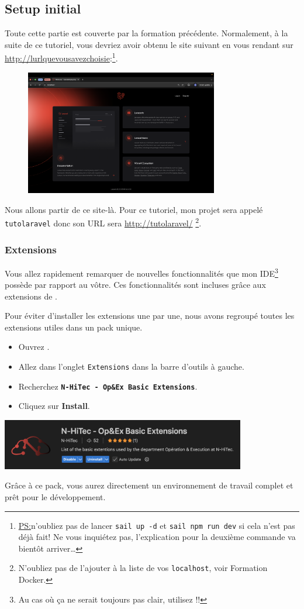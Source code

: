 \subsection{Setup initial}

Toute cette partie est couverte par la formation précédente. Normalement, à la suite de ce tutoriel, vous devriez avoir obtenu le site suivant en vous rendant sur \url{http://lurlquevousavezchoisie}:\footnote{\underline{PS:}n'oubliez pas de lancer \verb|sail up -d| et \verb|sail npm run dev| si cela n'est pas déjà fait! Ne vous inquiétez pas, l'explication pour la deuxième commande va bientôt arriver\ldots}.

\begin{figure}[!h]
    \centering
    \includegraphics[width=0.75\textwidth]{figures-C1/laravel_default_website.png}
\end{figure}

Nous allons partir de ce site-là. Pour ce tutoriel, mon projet sera appelé \texttt{tutolaravel} donc son URL sera \url{http://tutolaravel/} \footnote{N'oubliez pas de l'ajouter à la liste de vos \texttt{localhost}, voir Formation Docker.}.

\newpage
\subsubsection[Extensions]{Extensions}

Vous allez rapidement remarquer de nouvelles fonctionnalités que mon IDE\footnote{Au cas où ça ne serait toujours pas clair, utilisez \vscode{} !!} possède par rapport au vôtre. Ces fonctionnalités sont incluses grâce aux extensions de \vscode{}. 

Pour éviter d’installer les extensions une par une, nous avons regroupé toutes les extensions utiles dans un pack unique.  

\begin{itemize}
    \item Ouvrez \vscode{}.
    \item Allez dans l’onglet \verb|Extensions| dans la barre d’outils à gauche.
    \item Recherchez \textbf{\texttt{N-HiTec - Op\&Ex Basic Extensions}}.
    \item Cliquez sur \textbf{Install}.
\end{itemize}

\begin{center}
    \includegraphics[width=0.8\textwidth]{figures-C1/nhitecpack.png}
\end{center}

Grâce à ce pack, vous aurez directement un environnement de travail complet et prêt pour le développement.